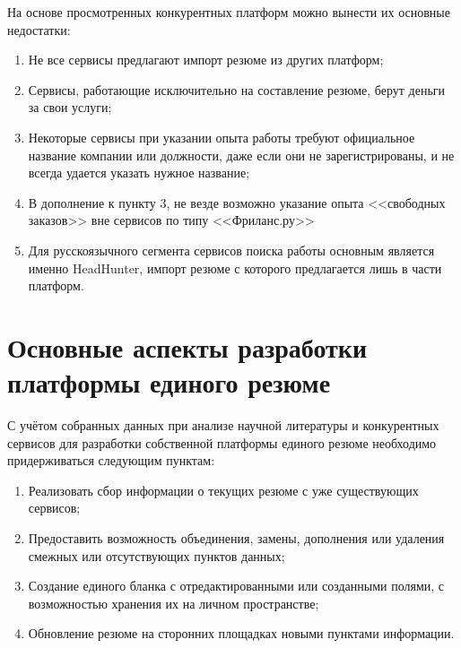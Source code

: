 \documentclass[master, och, pract]{SCWorks}
\begin{document}
На основе просмотренных конкурентных платформ можно вынести их основные недостатки:
\begin{enumerate}
    \item Не все сервисы предлагают импорт резюме из других платформ;
    \item Сервисы, работающие исключительно на составление резюме, берут деньги за свои услуги;
    \item Некоторые сервисы при указании опыта работы требуют официальное название 
    компании или должности, даже если они не зарегистрированы, 
    и не всегда удается указать нужное название;
    \item В дополнение к пункту 3, не везде возможно указание опыта <<свободных заказов>> 
    вне сервисов по типу <<Фриланс.ру>>
    \item Для русскоязычного сегмента сервисов поиска работы основным является именно 
    HeadHunter, импорт резюме с которого предлагается лишь в части платформ.
\end{enumerate}


\section{Основные аспекты разработки платформы единого резюме}
С учётом собранных данных при анализе научной литературы и конкурентных сервисов 
для разработки собственной платформы единого резюме необходимо придерживаться следующим пунктам:
\begin{enumerate}
    \item Реализовать сбор информации о текущих резюме с уже существующих сервисов;
    \item Предоставить возможность объединения, замены, дополнения или удаления 
    смежных или отсутствующих пунктов данных;
    \item Создание единого бланка с отредактированными или созданными полями, 
    с возможностью хранения их на личном пространстве;
    \item Обновление резюме на сторонних площадках новыми пунктами информации.
\end{enumerate}
\end{document}
